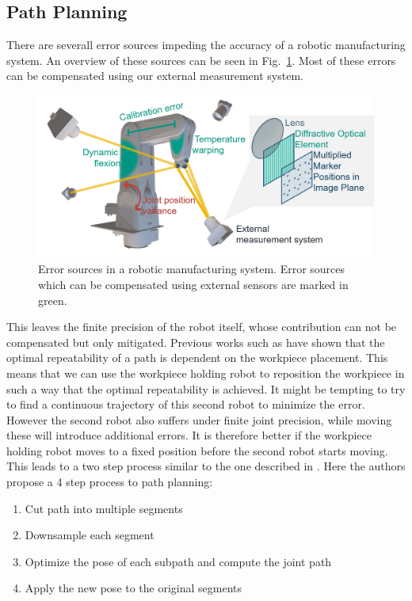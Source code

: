 \documentclass[5p,times,procedia]{elsarticle}
\begin{document}
\subsection{Path Planning}
There are severall error sources impeding the accuracy of a robotic manufacturing system.
An overview of these sources can be seen in Fig.~\ref{fig:error_sources}.
Most of these errors can be compensated using our external measurement system.
\begin{figure}[h]
\centering
\includegraphics[width=\columnwidth]{graphics/error_sources.png}
\caption{Error sources in a robotic manufacturing system. Error sources which can be compensated using external sensors are marked in green.}
\label{fig:error_sources}
\end{figure}
This leaves the finite precision of the robot itself, whose contribution can not be compensated but only mitigated.
Previous works such as \cite{previous_work} have shown that the optimal repeatability of a path is dependent on the workpiece placement.
This means that we can use the workpiece holding robot to reposition the workpiece in such a way that the optimal repeatability is achieved.
It might be tempting to try to find a continuous trajectory of this second robot to minimize the error.
However the second robot also suffers under finite joint precision, while moving these will introduce additional errors.
It is therefore better if the workpiece holding robot moves to a fixed position before the second robot starts moving.
This leads to a two step process similar to the one described in \cite{stroke_division}.
Here the authors propose a 4 step process to path planning:
\begin{enumerate}
  \item Cut path into multiple segments
  \item Downsample each segment
  \item Optimize the pose of each subpath and compute the joint path
  \item Apply the new pose to the original segments
\end{enumerate}
\end{document}
